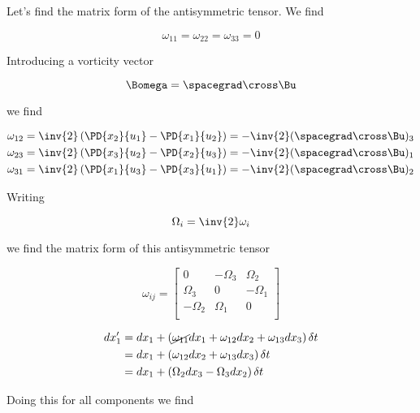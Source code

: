 Let's find the matrix form of the antisymmetric tensor.  We find

\begin{equation}\label{eqn:continuumL8:330}
\omega_{11} = \omega_{22} = \omega_{33} = 0
\end{equation}

Introducing a vorticity vector

\begin{equation}\label{eqn:continuumL8:350}
\Bomega = \spacegrad \cross \Bu
\end{equation}

we find

\begin{align}\label{eqn:continuumL8:370}
\omega_{12} &= \inv{2}\left( \PD{x_2}{u_1} -\PD{x_1}{u_2} \right) = - \inv{2} (\spacegrad \cross \Bu)_3 \\
\omega_{23} &= \inv{2}\left( \PD{x_3}{u_2} -\PD{x_2}{u_3} \right) = - \inv{2} (\spacegrad \cross \Bu)_1 \\
\omega_{31} &= \inv{2}\left( \PD{x_1}{u_3} -\PD{x_3}{u_1} \right) = - \inv{2} (\spacegrad \cross \Bu)_2
\end{align}

Writing

\begin{equation}\label{eqn:continuumL8:390}
\Omega_i = \inv{2} \omega_i
\end{equation}

we find the matrix form of this antisymmetric tensor

\begin{equation}\label{eqn:continuumL8:410}
\omega_{ij}
=
\begin{bmatrix}
0 & -\Omega_3 & \Omega_2 \\
\Omega_3 & 0 & -\Omega_1 \\
-\Omega_2 & \Omega_1 & 0 \\
\end{bmatrix}
\end{equation}

\begin{align*}
dx_1'
&= dx_1 + \left( \cancel{\omega_{11}} dx_1 + \omega_{12} dx_2 + \omega_{13} dx_3 \right) \delta t \\
&= dx_1 + \left( \omega_{12} dx_2 + \omega_{13} dx_3 \right) \delta t \\
&= dx_1 + \left( \Omega_2 dx_3 - \Omega_3 dx_2 \right) \delta t
\end{align*}

Doing this for all components we find


